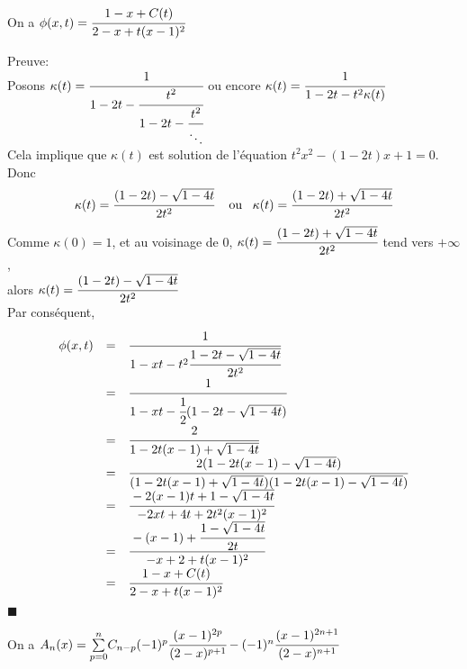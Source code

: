 \begin{corollaire} \label{phiEqCOfT}
	On a $\phi(x,t)=\cfrac{1-x+C(t)}{2-x+t(x-1)^{2}}$
\end{corollaire}
Preuve:\\
Posons $\kappa(t)=\cfrac{1}{1-2t-\cfrac{t^2}{1-2t-\cfrac{t^2}{\ddots}}}$\hspace{5pt}
ou encore $\kappa(t)=\cfrac{1}{1-2t-t^2\kappa(t)}$\vspace{10pt}\\
Cela implique que $\kappa(t)$ est solution de l'équation $t^2x^2-(1-2t)x+1=0$.\vspace{10pt}\\Donc \[
	\kappa(t)=\cfrac{(1-2t)-\sqrt{1-4t}}{2t^2} \text{ \hspace{5pt} ou  \hspace{5pt}} \kappa(t)=\cfrac{(1-2t)+\sqrt{1-4t}}{2t^2}
\]
Comme $\kappa(0)=1$, et au voisinage de 0,  $\kappa(t)=\cfrac{(1-2t)+\sqrt{1-4t}}{2t^2}$ tend vers $+\infty$,\vspace{10pt}\\alors $\kappa(t)=\cfrac{(1-2t)-\sqrt{1-4t}}{2t^2}$\vspace{10pt}\\
Par conséquent,
\[
	\begin{array}{r c l}
		\phi(x,t) & = & \cfrac{1}{1-xt-t^2\cfrac{1-2t-\sqrt{1-4t}}{2t^2}}                                \\
		          & = & \cfrac{1}{1-xt-\cfrac{1}{2}(1-2t-\sqrt{1-4t})}                                   \\
		          & = & \cfrac{2}{1-2t(x-1)+\sqrt{1-4t}}                                                 \\
		          & = & \cfrac{2(1-2t(x-1)-\sqrt{1-4t})}{(1-2t(x-1)+\sqrt{1-4t})(1-2t(x-1)-\sqrt{1-4t})} \\
		          & = & \cfrac{-2(x-1)t+1-\sqrt{1-4t}}{-2xt+4t+2t^2(x-1)^2}                              \\
		          & = & \cfrac{-(x-1)+\cfrac{1-\sqrt{1-4t}}{2t}}{-x+2+t(x-1)^2}                          \\
		          & = & \cfrac{1-x+C(t)}{2-x+t(x-1)^{2}}
	\end{array}
\]
$\blacksquare$
\text{ }
\begin{proposition}
	On a
	$
		A_{n}(x)=\underset{p=0}{\overset{n}{\sum}}C_{n-p}(-1)^p\cfrac{(x-1)^{2p}}{(2-x)^{p+1}}-(-1)^n\cfrac{(x-1)^{2n+1}}{(2-x)^{n+1}}
	$
\end{proposition}
\text{ }\vspace{5pt}\\
